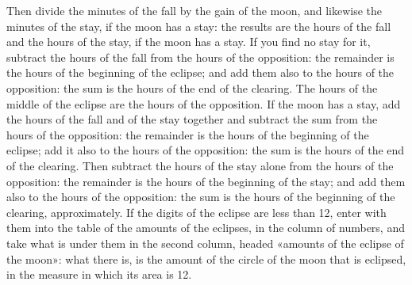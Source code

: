 \documentclass[11pt]{article}
\newcommand{\ArPage}[1]{\marginpar{\footnotesize\color{gray}Ar.\,p.\,#1}}
\begin{document}
\par \ArPage{153}Then divide the minutes of the fall by the gain of the moon, and likewise the minutes of the stay, if the moon has a stay: the results are the hours of the fall and the hours of the stay, if the moon has a stay. If you find no stay for it, subtract the hours of the fall from the hours of the opposition: the remainder is the hours of the beginning of the eclipse; and add them also to the hours of the opposition: the sum is the hours of the end of the clearing. The hours of the middle of the eclipse are the hours of the opposition. If the moon has a stay, add the hours of the fall and of the stay together and subtract the sum from the hours of the opposition: the remainder is the hours of the beginning of the eclipse; add it also to the hours of the opposition: the sum is the hours of the end of the clearing. Then subtract the hours of the stay alone from the hours of the opposition: the remainder is the hours of the beginning of the stay; and add them also to the hours of the opposition: the sum is the hours of the beginning of the clearing, approximately. If the digits of the eclipse are less than 12, enter with them into the table of the amounts of the eclipses, in the column of numbers, and take what is under them in the second column, headed «amounts of the eclipse of the moon»: what there is, is the amount of the circle of the moon that is eclipsed, in the measure in which its area is 12.\par
\end{document}
